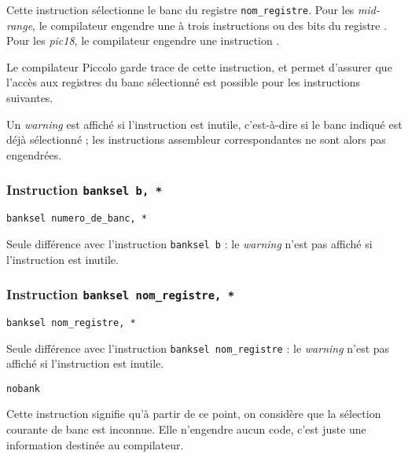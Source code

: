 Cette instruction sélectionne le banc du registre \texttt{nom\_registre}. Pour les \emph{mid-range}, le compilateur engendre une à trois instructions  ou  des bits  du registre . Pour les \emph{pic18}, le compilateur engendre une instruction .

Le compilateur Piccolo garde trace de cette instruction, et permet d'assurer que l'accès aux registres du banc sélectionné est possible pour les instructions suivantes.

Un \emph{warning} est affiché si l'instruction est inutile, c'est-à-dire si le banc indiqué est déjà sélectionné ; les instructions assembleur correspondantes ne sont alors pas engendrées.




\subsubsection{Instruction \texttt{banksel b, *}}
\begin{lstlisting}[language=piccolo]
banksel numero_de_banc, *
\end{lstlisting}

Seule différence avec l'instruction \texttt{banksel b} : le \emph{warning} n'est pas affiché si l'instruction est inutile.






\subsubsection{Instruction \texttt{banksel nom\_registre, *}}
\begin{lstlisting}[language=piccolo]
banksel nom_registre, *
\end{lstlisting}

Seule différence avec l'instruction \texttt{banksel nom\_registre} : le \emph{warning} n'est pas affiché si l'instruction est inutile.







\begin{lstlisting}[language=piccolo]
nobank
\end{lstlisting}

Cette instruction signifie qu'à partir de ce point, on considère que la sélection courante de banc est inconnue. Elle n'engendre aucun code, c'est juste une information destinée au compilateur.

